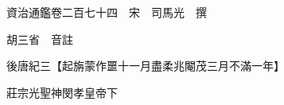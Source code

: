 










 


 
 


 

  
  
  
  
  





  
  
  
  
  
 
  

  

  
  
  



  

 
 

  
   




  

  
  


  　　資治通鑑卷二百七十四　宋　司馬光　撰

　　胡三省　音註

　　後唐紀三【起旃蒙作噩十一月盡柔兆閹茂三月不滿一年】

　　莊宗光聖神閔孝皇帝下

